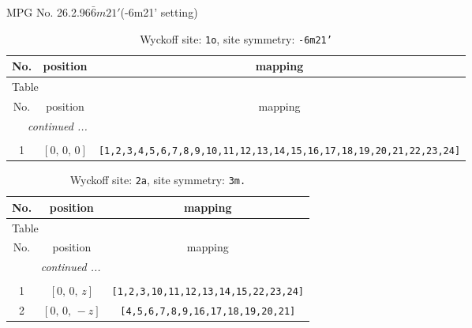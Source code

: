 \documentclass[fleqn,8pt]{jsarticle}
\begin{document}
\setcounter{MaxMatrixCols}{32}

\renewcommand{\tablename}{Table~}
\renewcommand{\figurename}{Figure~}
\begin{center}
\LARGE
MPG No. 26.2.96\quad$\bar{6}m21'$\quad(-6m21' setting)
\end{center}
\renewcommand{\arraystretch}{1.2}
\begin{longtable}{ccc}
\caption{Wyckoff site: {\tt 1o}, site symmetry: {\tt -6m21'}}
 \\
 \hline \hline
No. & position & mapping \\ \hline \endfirsthead

\multicolumn{2}{l}{\tablename\ \thetable{}} \\
 \hline \hline
No. & position & mapping \\ \hline \endhead

 \hline \hline
\multicolumn{2}{r}{\footnotesize\it continued ...} \\ \endfoot

 \hline \hline
\multicolumn{2}{r}{} \\ \endlastfoot

1 & $\left[ 0,\, 0,\, 0 \right]$ & {\tt [1,2,3,4,5,6,7,8,9,10,11,12,13,14,15,16,17,18,19,20,21,22,23,24]} \\
\end{longtable}
\renewcommand{\arraystretch}{1.2}
\begin{longtable}{ccc}
\caption{Wyckoff site: {\tt 2a}, site symmetry: {\tt 3m.}}
 \\
 \hline \hline
No. & position & mapping \\ \hline \endfirsthead

\multicolumn{2}{l}{\tablename\ \thetable{}} \\
 \hline \hline
No. & position & mapping \\ \hline \endhead

 \hline \hline
\multicolumn{2}{r}{\footnotesize\it continued ...} \\ \endfoot

 \hline \hline
\multicolumn{2}{r}{} \\ \endlastfoot

1 & $\left[ 0,\, 0,\, z \right]$ & {\tt [1,2,3,10,11,12,13,14,15,22,23,24]} \\ \hline
2 & $\left[ 0,\, 0,\, - z \right]$ & {\tt [4,5,6,7,8,9,16,17,18,19,20,21]} \\
\end{longtable}
\renewcommand{\arraystretch}{1.2}
\end{document}
